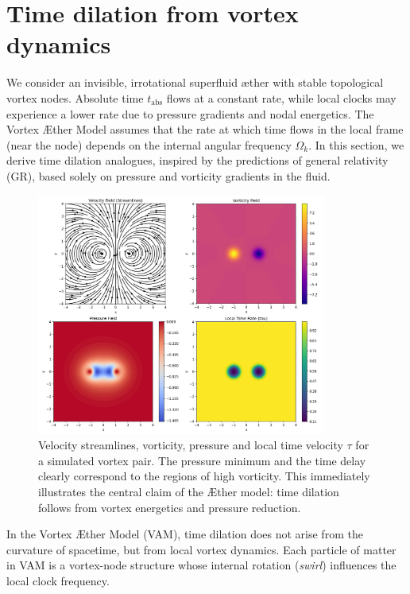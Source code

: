 \section{Time dilation from vortex dynamics}

We consider an invisible, irrotational superfluid æther with stable topological vortex nodes. Absolute time $t_{\text{abs}}$ flows at a constant rate, while local clocks may experience a lower rate due to pressure gradients and nodal energetics. The Vortex Æther Model assumes that the rate at which time flows in the local frame (near the node) depends on the internal angular frequency $\Omega_k$. In this section, we derive time dilation analogues, inspired by the predictions of general relativity (GR), based solely on pressure and vorticity gradients in the fluid.

\begin{figure}[htbp]
    \centering
    \includegraphics[width=0.85\textwidth]{streamlinesDiPole}
    \caption{Velocity streamlines, vorticity, pressure and local time velocity $\tau$ for a simulated vortex pair. The pressure minimum and the time delay clearly correspond to the regions of high vorticity. This immediately illustrates the central claim of the Æther model: time dilation follows from vortex energetics and pressure reduction.}
    \label{fig:vortexfields}
\end{figure}

In the Vortex Æther Model (VAM), time dilation does not arise from the curvature of spacetime, but from local vortex dynamics. Each particle of matter in VAM is a vortex-node structure whose internal rotation (\textit{swirl}) influences the local clock frequency.

